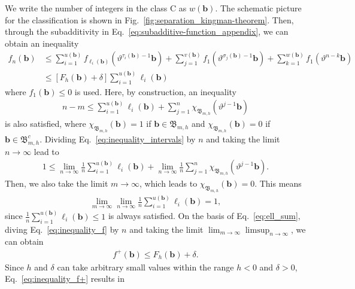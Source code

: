 \documentclass[preprint,pteplogo]{ptephy_v2}%
\numberwithin{equation}{section}
\theoremstyle{definition}
\begin{document}
We write the number of integers in the class C as $w(\bm{b})$. 
The schematic picture for the classification is shown in Fig.~\ref{fig:separation_kingman-theorem}.
Then, through the subadditivity in Eq.~\eqref{eq:subadditive-function_appendix}, we can obtain an inequality
\begin{align}
    f_n(\bm{b})&\leq\sum_{i=1}^{u(\bm{b})}
    f_{\ell_i(\bm{b})}\left(\vartheta^{\tau_i(\bm{b})-1}\bm{b}\right)
    +\sum_{j=1}^{v(\bm{b})}f_1\left(\vartheta^{\sigma_j(\bm{b})-1}\bm{b}\right)
    +\sum_{k=1}^{w(\bm{b})}f_1(\vartheta^{n-k}\bm{b})\nonumber\\
    &\leq\left[F_h(\bm{b})+\delta\right]\sum_{i=1}^{u(\bm{b})}\ell_i(\bm{b})
    \label{eq:inequality_f}
\end{align}
where $f_1(\bm{b})\leq0$ is used. 
Here, by construction, an inequality 
\begin{align}
    n-m
    \leq\sum_{i=1}^{u(\bm{b})}\ell_i(\bm{b})
    +\sum_{j=1}^n\chi_{\mathfrak{B}_{m,h}}(\vartheta^{j-1}\bm{b})
    \label{eq:inequality_intervals}
\end{align}
is also satisfied, where $\chi_{\mathfrak{B}_{m,h}}(\bm{b})=1$ if $\bm{b} \in \mathfrak{B}_{m,h}$ and $\chi_{\mathfrak{B}_{m,h}}(\bm{b})=0$ if $\bm{b} \in \mathfrak{B}_{m,h}^c$. 
Dividing Eq.~\eqref{eq:inequality_intervals} by $n$ and taking the limit $n\rightarrow\infty$ lead to
\begin{align}
    1\leq
    \lim_{n\rightarrow\infty}\frac{1}{n}\sum_{i=1}^{u(\bm{b})}\ell_i(\bm{b})
    +\lim_{n\rightarrow\infty}\frac{1}{n}\sum_{j=1}^n\chi_{\mathfrak{B}_{m,h}}(\vartheta^{j-1}\bm{b}).
    \label{eq:inequality_ell}
\end{align}
Then, we also take the limit $m\rightarrow\infty$, which leads to $\chi_{\mathfrak{B}_{m,h}}(\bm{b})=0$. 
This means 
\begin{align}
    \lim_{m\rightarrow\infty}\lim_{n\rightarrow\infty}\frac{1}{n}\sum_{i=1}^{u(\bm{b})}\ell_i(\bm{b})=1,
    \label{eq:ell_sum}
\end{align}
since $\frac{1}{n}\sum_{i=1}^{u(\bm{b})}\ell_i(\bm{b})\leq1$ is always satisfied. 
On the basis of Eq.~\eqref{eq:ell_sum}, diving Eq.~\eqref{eq:inequality_f} by $n$ and taking the limit $\lim_{m\rightarrow\infty}\limsup_{n\rightarrow\infty}$, we can obtain 
\begin{align}
    f^+(\bm{b}) \leq F_h(\bm{b})+\delta.
    \label{eq:inequality_f+}
\end{align}
Since $h$ and $\delta$ can take arbitrary small values within the range $h<0$ and $\delta>0$, Eq.~\eqref{eq:inequality_f+} results in
\end{document}
